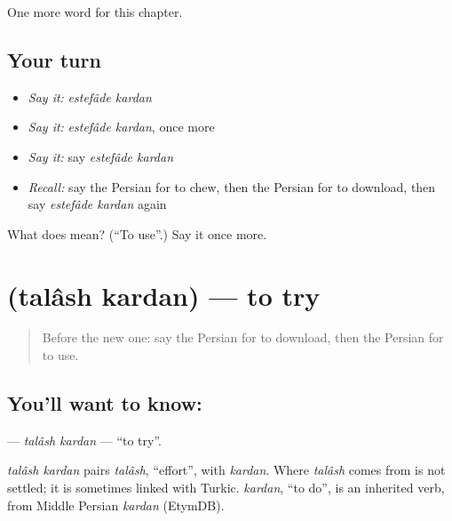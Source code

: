 \begin{grammarlens}[title={What you've built}]
One more word for this chapter.
\end{grammarlens}

\subsection*{Your turn}
\begin{itemize}
\raggedright
  \item \emph{Say it:} \emph{estefâde kardan}
  \item \emph{Say it:} \emph{estefâde kardan}, once more
  \item \emph{Say it:} say \emph{estefâde kardan}
  \item \emph{Recall:} say the Persian for to chew, then the Persian for to download, then say \emph{estefâde kardan} again
\end{itemize}

\begin{tcolorbox}[breakable,colback=teal!4,colframe=teal!35!black,title={Before you move on}]
What does   mean? (\textquotedblleft{}To use\textquotedblright{}.) Say it once more.
\end{tcolorbox}
\section[\texorpdfstring{\fa{تلاش} \fa{کردن} (talâsh kardan)}{تلاش کردن (talâsh kardan)}]{  (talâsh kardan) — to try}

\label{lesson:FA-C256-talash-kardan}



\begin{quote}
Before the new one: say the Persian for to download, then the Persian for to use.
\end{quote}

\subsection*{You'll want to know:  }
\textbf{ } — \emph{talâsh kardan} — \textquotedblleft{}to try\textquotedblright{}.

\begin{cousinweb}
\emph{talâsh kardan} pairs \emph{talâsh}, \textquotedblleft{}effort\textquotedblright{}, with \emph{kardan}. Where \emph{talâsh} comes from is not settled; it is sometimes linked with Turkic. \emph{kardan}, \textquotedblleft{}to do\textquotedblright{}, is an inherited verb, from Middle Persian \emph{kardan} (EtymDB).
\end{cousinweb}

